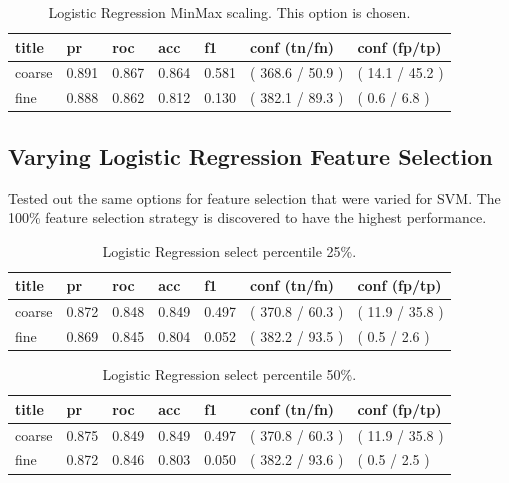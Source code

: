\documentclass[ms]{nuthesis}
\begin{document}
\FloatBarrier
\begin{table}[H]
\centering
\caption{Logistic Regression MinMax scaling. This option is chosen.}
\label{tab:LogRegMinMax}
\begin{tabular}{|l||l||l||l||l||l||l|}\toprule
title & pr & roc & acc & f1 & conf (tn/fn) & conf (fp/tp) \\ \midrule
coarse & 0.891 & 0.867 & 0.864 & 0.581 & ( 368.6 / 50.9 ) & ( 14.1 / 45.2 ) \\
fine & 0.888 & 0.862 & 0.812 & 0.130 & ( 382.1 / 89.3 ) & ( 0.6 / 6.8 ) \\ \bottomrule
\end{tabular}
\end{table}
\FloatBarrier


\subsection{Varying Logistic Regression Feature Selection}
\par Tested out the same options for feature selection that were varied for SVM.
The 100\% feature selection strategy is discovered to have the highest performance.

\FloatBarrier
\begin{table}[H]
\centering
\caption{Logistic Regression select percentile 25\%.}
\label{tab:LogRegSel25}
\begin{tabular}{|l||l||l||l||l||l||l|}\toprule
title & pr & roc & acc & f1 & conf (tn/fn) & conf (fp/tp) \\ \midrule
coarse & 0.872 & 0.848 & 0.849 & 0.497 & ( 370.8 / 60.3 ) & ( 11.9 / 35.8 ) \\
fine & 0.869 & 0.845 & 0.804 & 0.052 & ( 382.2 / 93.5 ) & ( 0.5 / 2.6 ) \\ \bottomrule
\end{tabular}
\end{table}
\FloatBarrier


\FloatBarrier
\begin{table}[H]
\centering
\caption{Logistic Regression select percentile 50\%.}
\label{tab:LogRegSel50}
\begin{tabular}{|l||l||l||l||l||l||l|}\toprule
title & pr & roc & acc & f1 & conf (tn/fn) & conf (fp/tp) \\ \midrule
coarse & 0.875 & 0.849 & 0.849 & 0.497 & ( 370.8 / 60.3 ) & ( 11.9 / 35.8 ) \\
fine & 0.872 & 0.846 & 0.803 & 0.050 & ( 382.2 / 93.6 ) & ( 0.5 / 2.5 ) \\ \bottomrule
\end{tabular}
\end{table}
\FloatBarrier
\end{document}
